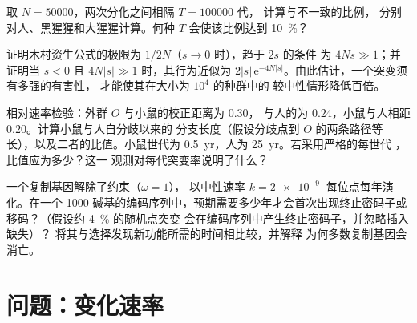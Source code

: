 \begin{exercise}[$\star\star$]\label{exo:b3:molecular-evolution:9}
取 $N = \num{50000}$，两次分化之间相隔 $T = \num{100000}$ 代，
计算与不一致的比例，
分别对人、黑猩猩和大猩猩计算。何种 $T$ 会使该比例达到
\qty{10}{\%}？
\end{exercise}

\begin{exercise}[$\star\star\star$]\label{exo:b3:molecular-evolution:10}
证明木村资生公式的极限为 $1/2N$（$s \to 0$ 时），趋于 $2s$ 的条件
为 $4Ns \gg 1$；并证明当 $s < 0$ 且 $4N|s| \gg 1$ 时，其行为近似为
$2|s|\,\mathrm{e}^{-4N|s|}$。由此估计，一个突变须有多强的有害性，
才能使其在大小为 $10^{4}$ 的种群中的
较中性情形降低百倍。
\end{exercise}

\begin{exercise}[$\star\star\star$]\label{exo:b3:molecular-evolution:11}
相对速率检验：外群 $O$ 与小鼠的校正距离为 $0.30$，
与人的为 $0.24$，小鼠与人相距 $0.20$。计算小鼠与人自分歧以来的
分支长度（假设分歧点到
$O$ 的两条路径等长），以及二者的比值。小鼠世代为
\qty{0.5}{yr}，人为 \qty{25}{yr}。若采用严格的每世代
，比值应为多少？这一
观测对每代突变率说明了什么？
\end{exercise}

\begin{exercise}[$\star\star\star$]\label{exo:b3:molecular-evolution:12}
一个复制基因解除了约束（$\omega = 1$），
以中性速率 $k = \qty{2e-9}{}$ 每位点每年演化。在一个 1000
碱基的编码序列中，预期需要多少年才会首次出现终止密码子或
移码？（假设约 \qty{4}{\%} 的随机点突变
会在编码序列中产生终止密码子，并忽略插入缺失）？
将其与选择发现新功能所需的时间相比较，并解释
为何多数复制基因会消亡。
\end{exercise}

\section{问题：变化速率}

